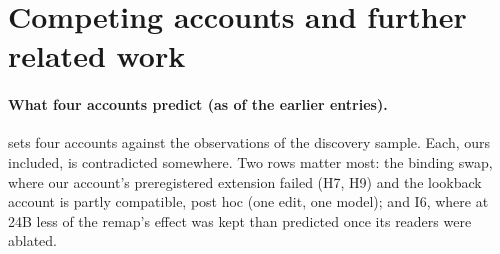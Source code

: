 \section{Competing accounts and further related work}\label{app:accounts}\label{app:discussion}

\paragraph{What four accounts predict (as of the earlier entries).}
 sets four accounts against the observations of the discovery sample. Each, ours included, is contradicted somewhere. Two rows matter most: the binding swap, where our account's preregistered extension failed (H7, H9) and the lookback account is partly compatible, post hoc (one edit, one model); and I6, where at 24B less of the remap's effect was kept than predicted once its readers were ablated.

\begin{table}[!ht]
  \centering
  \caption{\textbf{What four accounts predict, as of the entries of the discovery sample.} DT: duplicate-token attention alone; LB: lookback addresses and payloads \citep{prakash2025lookbacks,wu2026record}; FF: an edit's channel is set by the format it was fit in; LM: later-mention readers (ours). $\checkmark$: predicted and observed; $\times$: predicted otherwise (refuted); --: silent; (ph): compatible, post hoc; $\checkmark$/$\times$: the attention is predicted, its presence without a read is not; $\checkmark$/(ph): the attention is predicted, its presence without a read is explained post hoc (the read is decided downstream). Binding-swap row: \cref{app:binding}; last two rows: \cref{app:stage7}. The final round's results are added in the text.}
  \label{tab:accounts}
  {\small}
\end{table}

